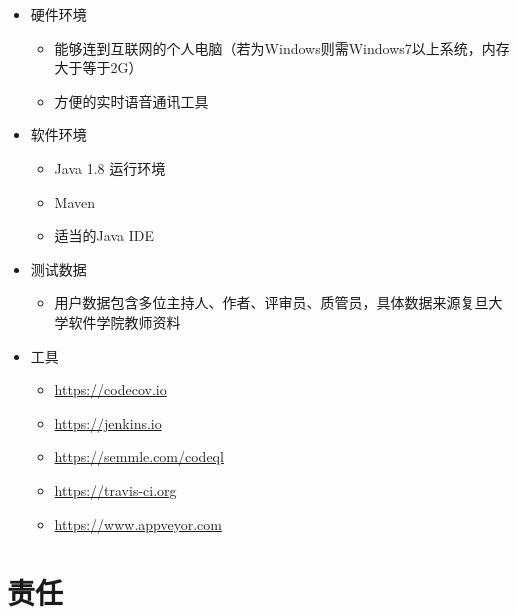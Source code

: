 \documentclass[hyperref, a4paper]{ctexart}
\providecommand{\tightlist}{%
  \setlength{\itemsep}{0pt}\setlength{\parskip}{0pt}}
\begin{document}
\begin{itemize}
\tightlist
\item
  硬件环境

  \begin{itemize}
  \tightlist
  \item
    能够连到互联网的个人电脑（若为Windows则需Windows7以上系统，内存大于等于2G）
  \item
    方便的实时语音通讯工具
  \end{itemize}
\item
  软件环境

  \begin{itemize}
  \tightlist
  \item
    Java 1.8 运行环境
  \item
    Maven
  \item
    适当的Java IDE
  \end{itemize}
\item
  测试数据

  \begin{itemize}
  \tightlist
  \item
    用户数据包含多位主持人、作者、评审员、质管员，具体数据来源复旦大学软件学院教师资料
  \end{itemize}
\item
  工具

  \begin{itemize}
  \tightlist
  \item
    \url{https://codecov.io}
  \item
    \url{https://jenkins.io}
  \item
    \url{https://semmle.com/codeql}
  \item
    \url{https://travis-ci.org}
  \item
    \url{https://www.appveyor.com}
  \end{itemize}
\end{itemize}

\hypertarget{ux8d23ux4efb}{%
\section{责任}\label{ux8d23ux4efb}}
\end{document}
